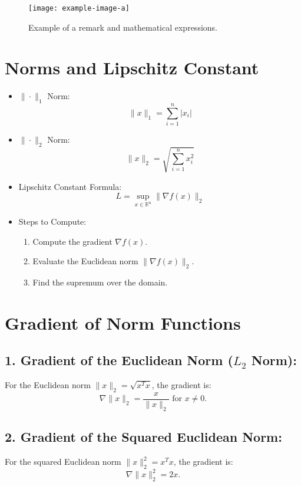\documentclass{article}
\begin{document}
\begin{figure}[h]
    \centering
    \texttt{[image: example-image-a]}
    \caption{Example of a remark and mathematical expressions.}
\end{figure}











\section*{Norms and Lipschitz Constant}

\begin{itemize}[left=0pt]
    \item $\| \cdot \|_1$ Norm:
    \[
    \|x\|_1 = \sum_{i=1}^{n} |x_i|
    \]

    \item $\| \cdot \|_2$ Norm:
    \[
    \|x\|_2 = \sqrt{\sum_{i=1}^{n} x_i^2}
    \]

    \item Lipschitz Constant Formula:
    \[
    L = \sup_{x \in \mathbb{R}^n} \|\nabla f(x)\|_2
    \]

    \item Steps to Compute:
    \begin{enumerate}
        \item Compute the gradient $\nabla f(x)$.
        \item Evaluate the Euclidean norm $\|\nabla f(x)\|_2$.
        \item Find the supremum over the domain.
    \end{enumerate}
\end{itemize}




\section*{Gradient of Norm Functions}

\subsection*{1. Gradient of the Euclidean Norm ($L_2$ Norm):}
For the Euclidean norm $\|x\|_2 = \sqrt{x^T x}$, the gradient is:
\[
\nabla \|x\|_2 = \frac{x}{\|x\|_2} \text{ for } x \neq 0.
\]

\subsection*{2. Gradient of the Squared Euclidean Norm:}
For the squared Euclidean norm $\|x\|^2_2 = x^T x$, the gradient is:
\[
\nabla \|x\|^2_2 = 2x.
\]
\end{document}
